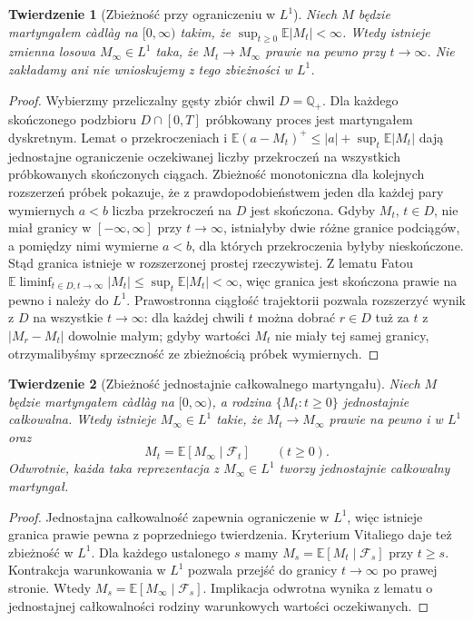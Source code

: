 \documentclass[11pt,a4paper,oneside]{report}
\numberwithin{equation}{chapter}
\theoremstyle{plain}
\newtheorem{twierdzenie}{Twierdzenie}[chapter]
\theoremstyle{definition}
\theoremstyle{remark}
\newcommand{\Q}{\mathbb{Q}}
\newcommand{\E}{\mathbb{E}}
\newcommand{\calF}{\mathcal{F}}
\begin{document}
\begin{twierdzenie}[Zbieżność przy ograniczeniu w $L^1$]
Niech $M$ będzie martyngałem c\`adl\`ag na $[0,\infty)$
takim, że $\sup_{t\ge0}\E|M_t|<\infty$.
Wtedy istnieje zmienna losowa $M_\infty\in L^1$ taka, że
$M_t\to M_\infty$ prawie na pewno przy $t\to\infty$.
Nie zakładamy ani nie wnioskujemy z tego zbieżności w $L^1$.
\end{twierdzenie}
\begin{proof}
Wybierzmy przeliczalny gęsty zbiór chwil
$D=\Q_+$. Dla każdego skończonego podzbioru
$D\cap[0,T]$ próbkowany proces jest martyngałem dyskretnym.
Lemat o przekroczeniach i
$\E(a-M_t)^+\le|a|+\sup_t\E|M_t|$
dają jednostajne ograniczenie oczekiwanej liczby
przekroczeń na wszystkich próbkowanych skończonych
ciągach. Zbieżność monotoniczna dla kolejnych
rozszerzeń próbek pokazuje, że z prawdopodobieństwem
jeden dla każdej pary wymiernych $a<b$ liczba
przekroczeń na $D$ jest skończona.
Gdyby $M_t$, $t\in D$, nie miał granicy w
$[-\infty,\infty]$ przy $t\to\infty$, istniałyby
dwie różne granice podciągów, a pomiędzy nimi
wymierne $a<b$, dla których przekroczenia byłyby
nieskończone. Stąd granica istnieje w rozszerzonej
prostej rzeczywistej. Z lematu Fatou
$\E\liminf_{t\in D,t\to\infty}|M_t|
\le\sup_t\E|M_t|<\infty$, więc granica jest skończona
prawie na pewno i należy do $L^1$.
Prawostronna ciągłość trajektorii pozwala rozszerzyć
wynik z $D$ na wszystkie $t\to\infty$: dla każdej
chwili $t$ można dobrać $r\in D$ tuż za $t$ z
$|M_r-M_t|$ dowolnie małym; gdyby wartości $M_t$
nie miały tej samej granicy, otrzymalibyśmy sprzeczność
ze zbieżnością próbek wymiernych.
\end{proof}

\begin{twierdzenie}[Zbieżność jednostajnie całkowalnego martyngału]
Niech $M$ będzie martyngałem c\`adl\`ag na
$[0,\infty)$, a rodzina $\{M_t:t\ge0\}$
jednostajnie całkowalna. Wtedy istnieje
$M_\infty\in L^1$ takie, że $M_t\to M_\infty$
prawie na pewno i w $L^1$ oraz
\[
M_t=\E[M_\infty\mid\calF_t]
\qquad (t\ge0).
\]
Odwrotnie, każda taka reprezentacja z $M_\infty\in L^1$
tworzy jednostajnie całkowalny martyngał.
\end{twierdzenie}
\begin{proof}
Jednostajna całkowalność zapewnia ograniczenie w $L^1$,
więc istnieje granica prawie pewna z poprzedniego
twierdzenia. Kryterium Vitaliego daje też zbieżność
w $L^1$. Dla każdego ustalonego $s$ mamy
$M_s=\E[M_t\mid\calF_s]$ przy $t\ge s$.
Kontrakcja warunkowania w $L^1$ pozwala przejść
do granicy $t\to\infty$ po prawej stronie.
Wtedy $M_s=\E[M_\infty\mid\calF_s]$.
Implikacja odwrotna wynika z lematu o jednostajnej
całkowalności rodziny warunkowych wartości oczekiwanych.
\end{proof}
\end{document}
